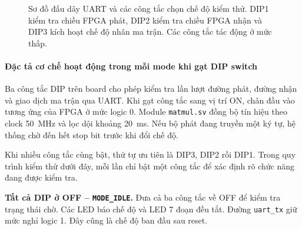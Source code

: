\begin{figure}[htbp]
{%
}
\caption{Sơ đồ đấu dây UART và các công tắc chọn chế độ kiểm thử.
DIP1 kiểm tra chiều FPGA phát, DIP2 kiểm tra chiều FPGA nhận và
DIP3 kích hoạt chế độ nhân ma trận. Các công tắc tác động ở mức thấp.}
\label{fig:uart_wiring}
\end{figure}

\paragraph*{Đặc tả cơ chế hoạt động trong mỗi mode khi gạt DIP switch}

Ba công tắc DIP trên board cho phép kiểm tra lần lượt đường phát,
đường nhận và giao dịch ma trận qua UART. Khi gạt công tắc sang
vị trí ON, chân đầu vào tương ứng của FPGA ở mức logic 0.
Module \texttt{matmul.sv} đồng bộ tín hiệu theo clock 50~MHz
và lọc dội khoảng 20~ms. Nếu bộ phát đang truyền một ký tự,
hệ thống chờ đến hết stop bit trước khi đổi chế độ.

Khi nhiều công tắc cùng bật, thứ tự ưu tiên là DIP3, DIP2 rồi
DIP1. Trong quy trình kiểm thử dưới đây, mỗi lần chỉ bật một
công tắc để xác định rõ chức năng đang được kiểm tra.

\medskip
\noindent\textbf{Tất cả DIP ở OFF -- \texttt{MODE\_IDLE}.}
Đưa cả ba công tắc về OFF để kiểm tra trạng thái chờ. Các LED
báo chế độ và LED 7 đoạn đều tắt. Đường \texttt{uart\_tx} giữ
mức nghỉ logic 1. Đây cũng là chế độ ban đầu sau reset.

